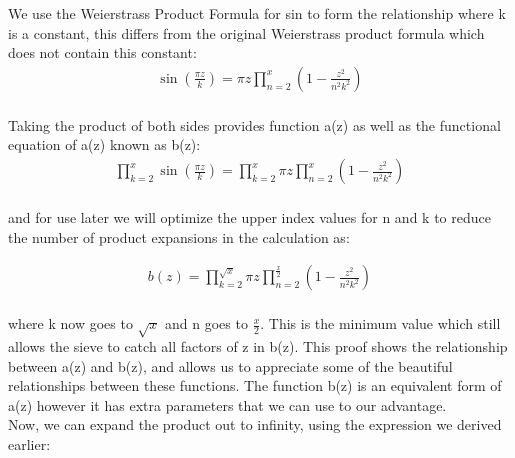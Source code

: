 \documentclass{article}
\begin{document}
We use the Weierstrass Product Formula for sin to form the relationship where k is a constant, this differs from the original Weierstrass product formula which does not contain this constant: \\
\begin{align*}
	\sin\left(\frac{\pi z}{k}\right) = \pi z\prod_{n=2}^x \left(1-\frac{z^2}{n^2k^2}\right) \\
\end{align*}

Taking the product of both sides provides function a(z) as well as the functional equation of a(z) known as b(z): \\
\begin{align*}
	\prod_{k=2}^x\sin\left(\frac{\pi z}{k}\right) = \prod_{k=2}^x \pi z\prod_{n=2}^x \left(1-\frac{z^2}{n^2k^2}\right) \\
\end{align*}

and for use later we will optimize the upper index values for n and k to reduce the number of product expansions in the calculation as:

\begin{align*}
	b(z) = \prod_{k=2}^{\sqrt{x}} \pi z\prod_{n=2}^{\frac{x}{2}} \left(1-\frac{z^2}{n^2k^2}\right) \\
\end{align*}

where k now goes to $\sqrt{x}$ and n goes to $\frac{x}{2}$. This is the minimum value which still allows the sieve to catch all factors of z in b(z). This proof shows the relationship between a(z) and b(z), and allows us to appreciate some of the beautiful relationships between these functions. The function b(z) is an equivalent form of a(z) however it has extra parameters that we can use to our advantage. \\

Now, we can expand the product out to infinity, using the expression we derived earlier:
\end{document}
